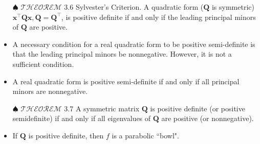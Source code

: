 \documentclass[12pt,thmsa]{article}
\begin{document}
\begin{itemize}
	\item[\(\spadesuit\)] \(\mathscr{THEOREM}\) 3.6 Sylvester's Criterion. A quadratic form (\(\boldsymbol{Q}\) is symmetric) \(\boldsymbol{x}^{\top} \boldsymbol{Q} \boldsymbol{x}, \boldsymbol{Q}=\boldsymbol{Q}^{\top}\), is positive definite if and only if the leading principal minors of \(\boldsymbol{Q}\) are positive.
	
	\item A necessary condition for a real quadratic form to be positive semi-definite is that the leading principal minors be nonnegative. However, it is not a sufficient condition.
	
	\item A real quadratic form is positive semi-definite if and only if all principal minors are nonnegative.
	
	\item[\(\spadesuit\)] \(\mathscr{THEOREM}\) 3.7 A symmetric matrix \(\boldsymbol{Q}\) is positive definite (or positive semidefinite) if and only if all eigenvalues of \(\boldsymbol{Q}\) are positive (or nonnegative).

\end{itemize}

\begin{itemize}
	\item If \(\boldsymbol{Q}\) is positive definite, then \(f\) is a parabolic ``bowl".
\end{itemize}

\begin{center}
\end{center}
\end{document}
